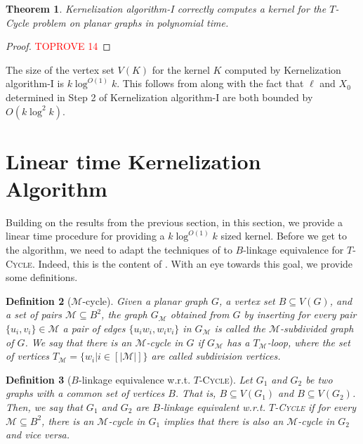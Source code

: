 \documentclass{article}
\newtheorem{theorem}{Theorem}
\newtheorem{definition}[theorem]{Definition}
\numberwithin{claimcounter}{lemma}
\newcommand{\tcycle}{$T$-\textsc{Cycle}\xspace}
\begin{document}
\begin{theorem}
    {\sc Kernelization algorithm-I} correctly computes a kernel for the  {\sc $T$-Cycle} problem on planar graphs in polynomial time.
\end{theorem}
\begin{proof}\textcolor{red}{TOPROVE 14}\end{proof}

The size of the vertex set $V(K)$ for the kernel $K$ computed by {\sc Kernelization algorithm-I} is $k \log^{O(1)}k$. This follows from  along with the fact that $\ell$ and $X_0$ determined in Step 2 of {\sc Kernelization algorithm-I} are both bounded by $O(k \log^2 k)$.


\section{Linear time Kernelization Algorithm} \label{sec:ltkernel}

Building on the results from the previous section, in this section, we provide a linear time procedure for providing a $k\log^{O(1)} k$ sized kernel. Before we get to the algorithm, we need to adapt the techniques of  to  $B$-linkage equivalence for \tcycle. Indeed, this is the content of . With an eye towards this goal, we provide some definitions.

\begin{definition}[$\mathcal{M}$-cycle]
     Given a planar graph $G$,  a vertex set $B\subseteq V(G)$, and a set of pairs $\mathcal{M} \subseteq B^2 $, the graph $G_\mathcal{M}$  obtained from $G$ by inserting for every pair $\{ u_i,v_i\} \in \mathcal{M}$ a pair of edges $\{u_iw_i,  w_iv_i\}$ in $G_{\mathcal{M}}$ is called the \emph{$\mathcal{M}$-subdivided graph of $G$}. We say that there is an  $\mathcal{M}$-cycle in $G$ if $G_\mathcal{M}$ has a $T_\mathcal{M}$-loop, where the set of vertices $T_{\mathcal{M}} =  \{w_i | i\in [|\mathcal{M}|]\}$ are called \emph{subdivision vertices}. \end{definition}

\begin{definition}[$B$-linkage equivalence w.r.t. \tcycle]
    Let $G_1$ and $G_2$ be two graphs with a common set of vertices $B$. That is, $B\subseteq V(G_1)$ and $B\subseteq V(G_2)$. Then, we say that $G_1$ and $G_2$ are \emph{$B$-linkage equivalent w.r.t. \tcycle} if for every $\mathcal{M} \subseteq B^2 $, there is an $\mathcal{M}$-cycle in $G_1$ implies that there is also an $\mathcal{M}$-cycle in $G_2$ and vice versa.   
\end{definition}
\end{document}
